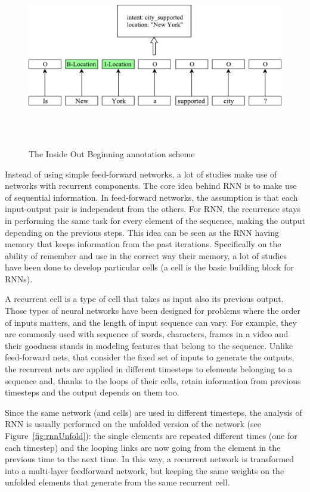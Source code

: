 \begin{figure}[!htb]
    \centering
    \includegraphics[max width=0.9\linewidth,max height=8cm,keepaspectratio]{figures/iob}
    \caption{The Inside Out Beginning annotation scheme}\label{fig:iob}
\end{figure}

Instead of using simple feed-forward networks, a lot of studies make use of networks with recurrent components. The core idea behind RNN is to make use of sequential information. In feed-forward networks, the assumption is that each input-output pair is independent from the others. For RNN, the recurrence stays in performing the same task for every element of the sequence, making the output depending on the previous steps. This idea can be seen as the RNN having memory that keeps information from the past iterations. Specifically on the ability of remember and use in the correct way their memory, a lot of studies have been done to develop particular cells (a cell is the basic building block for RNNs).

A recurrent cell is a type of cell that takes as input also its previous output. Those types of neural networks have been designed for problems where the order of inputs matters, and the length of input sequence can vary. For example, they are commonly used with sequence of words, characters, frames in a video and their goodness stands in modeling features that belong to the sequence. Unlike feed-forward nets, that consider the fixed set of inputs to generate the outputs, the recurrent nets are applied in different timesteps to elements belonging to a sequence and, thanks to the loops of their cells, retain information from previous timesteps and the output depends on them too.

Since the same network (and cells) are used in different timesteps, the analysis of RNN is usually performed on the unfolded version of the network (see Figure~\ref{fig:rnnUnfold}): the single elements are repeated different times (one for each timestep) and the looping links are now going from the element in the previous time to the next time. In this way, a recurrent network is transformed into a multi-layer feedforward network, but keeping the same weights on the unfolded elements that generate from the same recurrent cell.

